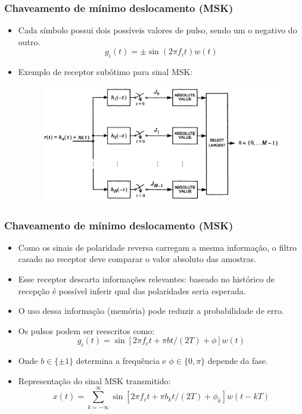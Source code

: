 \begin{frame}
	\frametitle{Chaveamento de mínimo deslocamento (MSK)}

	\begin{itemize}
	    \item Cada símbolo possui dois possíveis valores de pulso, sendo um o negativo do outro.
	    \begin{equation*}
		g_i(t) = \pm \sin(2\pi f_i t) w(t)
	    \end{equation*}
	    \item Exemplo de receptor subótimo para sinal MSK:
	    \begin{figure}[t]	
		\begin{center}
		\includegraphics[width=0.75\columnwidth]{figs/adv_26}
		\end{center}
	    \end{figure}
	\end{itemize}	
\end{frame}

\begin{frame}
	\frametitle{Chaveamento de mínimo deslocamento (MSK)}

	\begin{itemize}	   
	    \item Como os sinais de polaridade reversa carregam a mesma informação, o filtro casado no receptor deve comparar o valor absoluto das amostras.
	    \item Esse receptor descarta informações relevantes: baseado no histórico de recepção é possível inferir qual das polaridades seria esperada.
	    \item O uso dessa informação (memória) pode reduzir a probabilidade de erro.
	    \item Os pulsos podem ser reescritos como:
	    \begin{equation*}
		g_i(t) = \sin[2\pi f_c t + \pi bt/(2T) + \phi]w(t)
	    \end{equation*}
	    \item Onde $b \in \{\pm 1 \}$ determina a frequência e $\phi \in \{0, \pi\}$ depende da fase.
	    \item Representação do sinal MSK transmitido:
	    \begin{equation*}
		x(t) = \sum_{k=-\infty}^{\infty} \sin[2\pi f_c t + \pi b_k t/(2T) + \phi_k]w(t-kT)
	    \end{equation*}

	\end{itemize}	
\end{frame}

